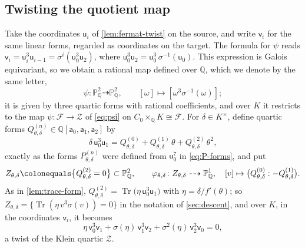 \documentclass[12pt]{amsart}
\renewcommand{\P}{\mathbb{P}}
\newcommand{\PP}{{\mathbb P}}
\newcommand{\Q}{\mathbb{Q}}
\newcommand{\Pone}{\P^{1}}
\newcommand{\calF}{{\mathcal F}}
\newcommand{\calZ}{{\mathcal Z}}
\newcommand{\sfa}{\mathsf{a}}
\newcommand{\sfu}{\mathsf{u}}
\newcommand{\sfv}{\mathsf{v}}
\DeclareMathOperator{\Tr}{Tr}
\numberwithin{equation}{section}
\theoremstyle{definition}
\begin{document}
\subsection{Twisting the quotient map}
Take the coordinates $\sfu_i$ of \cref{lem:fermat-twist} on the source, and write
$\sfv_i$ for the same linear forms, regarded as coordinates on the target. The
formula for $\psi$ reads $\sfv_i = \sfu_i^3\sfu_{i-1} = \sigma^i(\sfu_0^3\sfu_2)$,
where $\sfu_0^3\sfu_2 = \sfu_0^3\,\sigma^{-1}(\sfu_0)$. This expression is Galois
equivariant, so we obtain a rational map defined over $\Q$, which we denote by the
same letter,
\[
  \psi \colon \PP^2_\Q \dashrightarrow \PP^2_\Q, \qquad [\omega] \mapsto [\omega^{3}\sigma^{-1}(\omega)];
\]
it is given by three quartic forms with rational coefficients, and over $K$ it
restricts to the map $\psi \colon \calF \to \calZ$ of \cref{eq:psi} on $C_0 \times_\Q K \cong
\calF$. For $\delta \in K^{\times}$, define quartic forms $Q^{(n)}_{\theta,\delta}
\in \Q[\sfa_0,\sfa_1,\sfa_2]$ by
\begin{equation}
  \label{eq:Q-forms}
  \delta\, \sfu_0^{3}\sfu_1
  = Q^{(0)}_{\theta,\delta} + Q^{(1)}_{\theta,\delta}\,\theta + Q^{(2)}_{\theta,\delta}\,\theta^{2},
\end{equation}
exactly as the forms $P^{(n)}_{\theta,\delta}$ were defined from $\sfu_0^7$ in
\cref{eq:P-forms}, and put
\begin{equation}
  \label{eq:Z-and-varphi}
  Z_{\theta,\delta} \colonequals \bigl\{Q^{(2)}_{\theta,\delta} = 0\bigr\} \subset \PP^2_{\Q},
  \qquad
  \varphi_{\theta,\delta} \colon Z_{\theta,\delta} \dashrightarrow \Pone_{\Q},
  \quad [v] \mapsto \bigl(Q^{(0)}_{\theta,\delta} : -Q^{(1)}_{\theta,\delta}\bigr).
\end{equation}
As in \cref{lem:trace-form}, $Q^{(2)}_{\theta,\delta} = \Tr\bigl(\eta\,
\sfu_0^3\sfu_1\bigr)$ with $\eta = \delta/f'(\theta)$; so
$Z_{\theta,\delta} = \{\Tr(\eta\,v^3\sigma(v)) = 0\}$ in the notation of
\cref{sec:descent}, and over $K$, in the coordinates $\sfv_i$, it becomes
\begin{equation}
  \label{eq:klein-twist}
  \eta\,\sfv_0^{3}\sfv_1 + \sigma(\eta)\,\sfv_1^{3}\sfv_2 + \sigma^{2}(\eta)\,\sfv_2^{3}\sfv_0 = 0,
\end{equation}
a twist of the Klein quartic $\calZ$.
\end{document}
